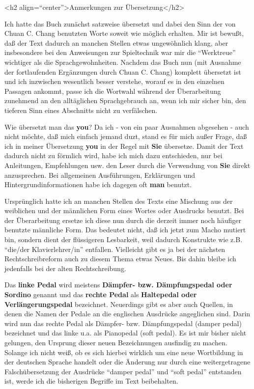 
\label{ueberset}

<h2 align=\enquote{center}>Anmerkungen zur Übersetzung</h2>

Ich hatte das Buch zunächst satzweise übersetzt und dabei den Sinn der von Chuan C. Chang benutzten Worte soweit wie möglich erhalten.
Mir ist bewußt, daß der Text dadurch an manchen Stellen etwas ungewöhnlich klang, aber insbesondere bei den Anweisungen zur Spieltechnik war mir die \enquote{Werktreue} wichtiger als die Sprachgewohnheiten.
Nachdem das Buch nun (mit Ausnahme der fortlaufenden Ergänzungen durch Chuan C. Chang) komplett übersetzt ist und ich inzwischen wesentlich besser verstehe, worauf es in den einzelnen Passagen ankommt, passe ich die Wortwahl während der Überarbeitung zunehmend an den alltäglichen Sprachgebrauch an, wenn ich mir sicher bin, den tieferen Sinn eines Abschnitts nicht zu verfälschen.

Wie übersetzt man das \textbf{you}?
 Da ich - von ein paar Ausnahmen abgesehen - auch nicht möchte, daß mich einfach jemand duzt, stand es für mich außer Frage, daß ich in meiner Übersetzung \textbf{you} in der Regel mit \textbf{Sie} übersetze.
Damit der Text dadurch nicht zu förmlich wird, habe ich mich dazu entschieden, nur bei Anleitungen, Empfehlungen usw.
den Leser durch die Verwendung von \textbf{Sie} direkt anzusprechen.
Bei allgemeinen Ausführungen, Erklärungen und Hintergrundinformationen habe ich dagegen oft \textbf{man} benutzt.


Ursprünglich hatte ich an manchen Stellen des Texts eine Mischung aus der weiblichen und der männlichen Form eines Wortes oder Ausdrucks benutzt.
Bei der Überarbeitung ersetze ich diese nun durch die derzeit immer noch häufiger benutzte männliche Form.
Das bedeutet nicht, daß ich jetzt zum Macho mutiert bin, sondern dient der flüssigeren Lesbarkeit, weil dadurch Konstrukte wie z.B. \enquote{die/der Klavierlehrer/in} entfallen.
Vielleicht gibt es ja bei der nächsten Rechtschreibreform auch zu diesem Thema etwas Neues.
Bis dahin bleibe ich jedenfalls bei der alten Rechtschreibung.


\label{Pedale}

Das \textbf{linke Pedal} wird meistens \textbf{Dämpfer- bzw. Dämpfungspedal oder Sordino} genannt und das \textbf{rechte Pedal} als \textbf{Haltepedal oder Verlängerungspedal} bezeichnet.
Neuerdings gibt es aber auch Quellen, in denen die Namen der Pedale an die englischen Ausdrücke angeglichen sind.
Darin wird nun das rechte Pedal als Dämpfer- bzw. Dämpfungspedal (damper pedal) bezeichnet und das linke u.a. als Pianopedal (soft pedal).
Es ist mir bisher nicht gelungen, den Ursprung dieser neuen Bezeichnungen ausfindig zu machen.
Solange ich nicht weiß, ob es sich hierbei wirklich um eine neue Wortbildung in der deutschen Sprache handelt oder die Änderung nur durch eine weitergetragene Falschübersetzung der Ausdrücke \enquote{damper pedal} und \enquote{soft pedal} entstanden ist, werde ich die bisherigen Begriffe im Text beibehalten.


